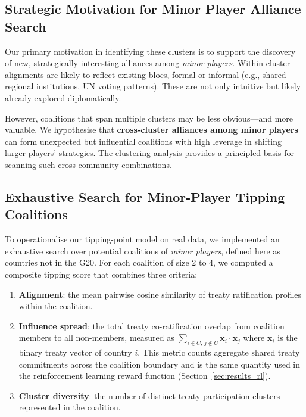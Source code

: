 \documentclass[11pt]{article}
\begin{document}
\subsection*{Strategic Motivation for Minor Player Alliance Search}

Our primary motivation in identifying these clusters is to support the discovery of new, strategically interesting alliances among \emph{minor players}. Within-cluster alignments are likely to reflect existing blocs, formal or informal (e.g., shared regional institutions, UN voting patterns). These are not only intuitive but likely already explored diplomatically.

However, coalitions that span multiple clusters may be less obvious—and more valuable. We hypothesise that \textbf{cross-cluster alliances among minor players} can form unexpected but influential coalitions with high leverage in shifting larger players' strategies. The clustering analysis provides a principled basis for scanning such cross-community combinations.

\subsection{Exhaustive Search for Minor-Player Tipping Coalitions}
\label{sec:minor_coalitions}

To operationalise our tipping-point model on real data, we implemented an exhaustive search over potential coalitions of \textit{minor players}, defined here as countries not in the G20. For each coalition of size 2 to 4, we computed a composite tipping score that combines three criteria:

\begin{enumerate}
	\item \textbf{Alignment}: the mean pairwise cosine similarity of treaty ratification profiles within the coalition.
	\item \textbf{Influence spread}: the total treaty co-ratification overlap from coalition members to all non-members, measured as $\sum_{i \in C,\, j \notin C} \mathbf{x}_i \cdot \mathbf{x}_j$ where $\mathbf{x}_i$ is the binary treaty vector of country $i$. This metric counts aggregate shared treaty commitments across the coalition boundary and is the same quantity used in the reinforcement learning reward function (Section~\ref{sec:results_rl}).
	\item \textbf{Cluster diversity}: the number of distinct treaty-participation clusters represented in the coalition.
\end{enumerate}
\end{document}
